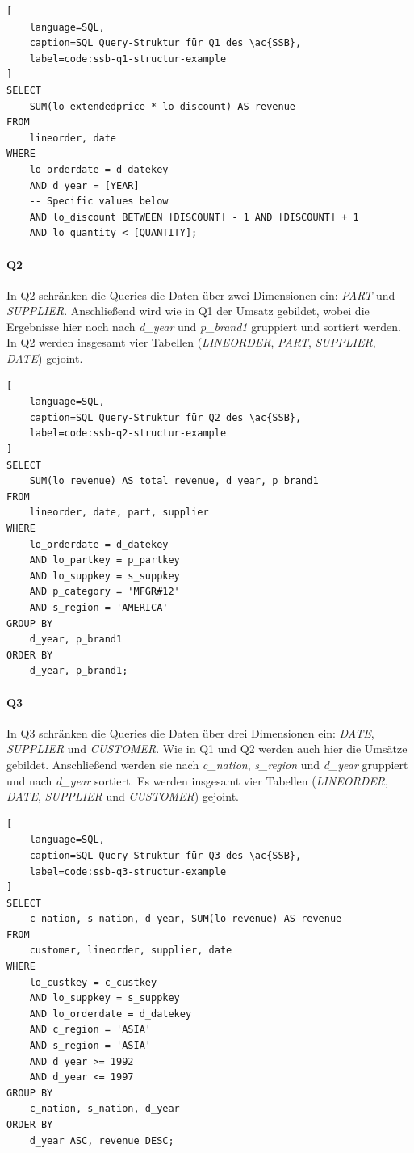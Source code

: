 \begin{lstlisting}[
    language=SQL,
    caption=SQL Query-Struktur für Q1 des \ac{SSB},
    label=code:ssb-q1-structur-example
]
SELECT 
    SUM(lo_extendedprice * lo_discount) AS revenue
FROM 
    lineorder, date
WHERE 
    lo_orderdate = d_datekey
    AND d_year = [YEAR]
    -- Specific values below
    AND lo_discount BETWEEN [DISCOUNT] - 1 AND [DISCOUNT] + 1
    AND lo_quantity < [QUANTITY];
\end{lstlisting}

\paragraph{Q2}\label{sec:ssb-q2}
In Q2 schränken die Queries die Daten über zwei Dimensionen ein: \emph{PART} und \emph{SUPPLIER}.
Anschließend wird wie in Q1 der Umsatz gebildet, wobei die Ergebnisse hier noch nach \emph{d\_year} und \emph{p\_brand1} gruppiert und sortiert werden.  
In Q2 werden insgesamt vier Tabellen (\emph{LINEORDER}, \emph{PART}, \emph{SUPPLIER}, \emph{DATE}) gejoint.
\begin{lstlisting}[
    language=SQL,
    caption=SQL Query-Struktur für Q2 des \ac{SSB},
    label=code:ssb-q2-structur-example
]
SELECT 
    SUM(lo_revenue) AS total_revenue, d_year, p_brand1
FROM 
    lineorder, date, part, supplier
WHERE 
    lo_orderdate = d_datekey
    AND lo_partkey = p_partkey
    AND lo_suppkey = s_suppkey
    AND p_category = 'MFGR#12'
    AND s_region = 'AMERICA'
GROUP BY 
    d_year, p_brand1
ORDER BY 
    d_year, p_brand1;

\end{lstlisting}

\paragraph{Q3}\label{sec:ssb-q3}
In Q3 schränken die Queries die Daten über drei Dimensionen ein: \emph{DATE}, \emph{SUPPLIER} und \emph{CUSTOMER}.
Wie in Q1 und Q2 werden auch hier die Umsätze gebildet.
Anschließend werden sie nach \emph{c\_nation}, \emph{s\_region} und \emph{d\_year} gruppiert und nach \emph{d\_year} sortiert.
Es werden insgesamt vier Tabellen (\emph{LINEORDER}, \emph{DATE}, \emph{SUPPLIER} und \emph{CUSTOMER}) gejoint.
\begin{lstlisting}[
    language=SQL,
    caption=SQL Query-Struktur für Q3 des \ac{SSB},
    label=code:ssb-q3-structur-example
]
SELECT 
    c_nation, s_nation, d_year, SUM(lo_revenue) AS revenue
FROM 
    customer, lineorder, supplier, date
WHERE 
    lo_custkey = c_custkey
    AND lo_suppkey = s_suppkey
    AND lo_orderdate = d_datekey
    AND c_region = 'ASIA'
    AND s_region = 'ASIA'
    AND d_year >= 1992
    AND d_year <= 1997
GROUP BY 
    c_nation, s_nation, d_year
ORDER BY 
    d_year ASC, revenue DESC;
\end{lstlisting}

